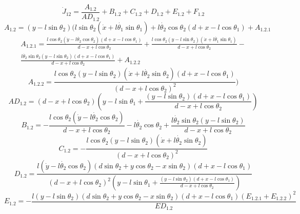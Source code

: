 \begin{equation}
	\dot{J}_{12} = \frac{A_{1.2}}{AD_{1.2}} + B_{1.2} + C_{1.2} + D_{1.2} + E_{1.2} + F_{1.2}
\end{equation}
\begin{equation*}
	A_{1.2} = (y-l\sin\theta_2)
	(l\sin\theta_2(\dot{x}+l\dot{\theta_1}\sin\theta_1)+l\dot{\theta_2}\cos\theta_2(d+x-l\cos\theta_1)+ A_{1.2.1}
\end{equation*}
\begin{equation*}
	\begin{split}
	A_{1.2.1} = \frac{l\cos\theta_2(\dot{y}-l\dot{\theta_2}\cos\theta_2)(d+x-l\cos\theta_1)}{d-x+l\cos\theta_2}+\frac{l\cos\theta_2(y-l\sin\theta_2)(\dot{x}+l\dot{\theta_1}\sin\theta_1)}{d-x+l\cos\theta_2}-\\
	\frac{l\dot{\theta_2}\sin\theta_2(y-l\sin\theta_2)(d+x-l\cos\theta_1)}{d-x+l\cos\theta_2} + A_{1.2.2}
	\end{split}
\end{equation*}
\begin{equation*}
	A_{1.2.2} = \frac{l\cos\theta_2(y-l\sin\theta_2)(\dot{x}+l\dot{\theta_2}\sin\theta_2)(d+x-l\cos\theta_1)}{(d-x+l\cos\theta_2)^2})
\end{equation*}
\begin{equation*}
	AD_{1.2} = (d-x+l\cos\theta_2)(y-l\sin\theta_1+\frac{(y-l\sin\theta_2)(d+x-l\cos\theta_1)}{d-x+l\cos\theta_2})
\end{equation*}
\begin{equation*}
	B_{1.2} = -\frac{l\cos\theta_2(\dot{y}-l\dot{\theta_2}\cos\theta_2)}{d-x+l\cos\theta_2} -l\dot{\theta_2}\cos\theta_2
	+\frac{l\dot{\theta_2}\sin\theta_2(y-l\sin\theta_2)}{d-x+l\cos\theta_2}
\end{equation*}
\begin{equation*}
	C_{1.2} = -\frac{l\cos\theta_2(y-l\sin\theta_2)(\dot{x}+l\dot{\theta_2}\sin\theta_2)}
	{(d-x+l\cos\theta_2)^2}
\end{equation*}
\begin{equation*}
	D_{1.2} =\frac{l(\dot{y}-l\dot{\theta_2}\cos\theta_2)(d\sin\theta_2+y\cos\theta_2-x\sin\theta_2)(d+x-l\cos\theta_1)}
	{{(d-x+l\cos\theta_2)}^2(y-l\sin\theta_1+\frac{(y-l\sin\theta_2)(d+x-l\cos\theta_1)}{d-x+l\cos\theta_2})}
\end{equation*}
\begin{equation*}
	E_{1.2} = -\frac{l(y-l\sin\theta_2)(d\sin\theta_2+y\cos\theta_2-x\sin\theta_2)(d+x-l\cos\theta_1)(E_{1.2.1}+E_{1.2.2})^2}
	{ED_{1.2}}
\end{equation*}

